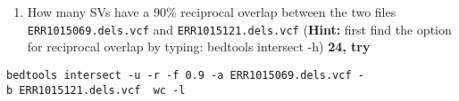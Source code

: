 \documentclass[11pt]{article}
\providecommand{\tightlist}{%
      \setlength{\itemsep}{0pt}\setlength{\parskip}{0pt}}
\begin{document}
\begin{enumerate}
\def\labelenumi{\arabic{enumi}.}
\setcounter{enumi}{5}
\tightlist
\item
  How many SVs have a 90\% reciprocal overlap between the two files
  \texttt{ERR1015069.dels.vcf} and \texttt{ERR1015121.dels.vcf}
  (\textbf{Hint:} first find the option for reciprocal overlap by
  typing: bedtools intersect -h) \textbf{24, try}
\end{enumerate}

\texttt{bedtools\ intersect\ -u\ -r\ -f\ 0.9\ -a\ ERR1015069.dels.vcf\ -b\ ERR1015121.dels.vcf\ \textbar{}\ wc\ -l}


\end{document}
